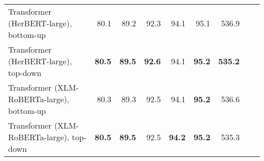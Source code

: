 \begin{table}[ht!]
{\begin{tabular}{lrrrrrrrr}
  Transformer (HerBERT-large), bottom-up & 80.1 & 89.2 & 92.3 & 94.1 & 95.1 & 536.9 \\ 
  Transformer (HerBERT-large), top-down & \textbf{80.5} & \textbf{89.5} & \textbf{92.6} & 94.1 & \textbf{95.2} & \textbf{535.2} \\ 
  Transformer (XLM-RoBERTa-large), bottom-up & 80.3 & 89.3 & 92.5 & 94.1 & \textbf{95.2} & 536.6 \\ 
  Transformer (XLM-RoBERTa-large), top-down & \textbf{80.5} & \textbf{89.5} & 92.5 & \textbf{94.2} & \textbf{95.2} & 535.3 \\ 
   \hline
\end{tabular}
}
\end{table}




